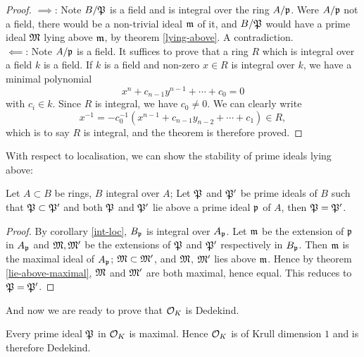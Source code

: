 			\begin{proof}
				$\implies$: Note $B/\mathfrak{P}$ is a field and is integral over the ring $A/\mathfrak{p}$. Were $A/\mathfrak{p}$ not a field, there would be a non-trivial ideal $\mathfrak{m}$ of it, and $B/\mathfrak{P}$ would have a prime ideal $\mathfrak{M}$ lying above $\mathfrak{m}$, by theorem \ref{lying-above}. A contradiction. \\
				$\impliedby$: Note $A/\mathfrak{p}$ is a field. It suffices to prove that a ring $R$ which is integral over a field $k$ is a field. If $k$ is a field and non-zero $x \in R$ is integral over $k$, we have a minimal polynomial
				\[
				x^n+c_{n-1}y^{n-1}+\cdots+c_0=0
				\]
				with $c_i \in k$. Since $R$ is integral, we have $c_0 \ne 0$. We can clearly write
				\[
				x^{-1}=-c_0^{-1}(x^{n-1}+c_{n-1}y_{n-2}+\cdots+c_1) \in R,
				\]
				which is to say $R$ is integral, and the theorem is therefore proved.
			\end{proof}
			With respect to localisation, we can show the stability of prime ideals lying above:
			\begin{corollary}
				Let $A \subset B$ be rings, $B$ integral over $A$; Let $\mathfrak{P}$ and $\mathfrak{P}'$ be prime ideals of $B$ such that $\mathfrak{P} \subset \mathfrak{P}'$ and both $\mathfrak{P}$ and $\mathfrak{P}'$ lie above a prime ideal $\mathfrak{p}$ of $A$, then $\mathfrak{P}=\mathfrak{P}'$. 
			\end{corollary}
			\begin{proof}
				By corollary \ref{int-loc}, $B_\mathfrak{p}$ is integral over $A_\mathfrak{p}$. Let $\mathfrak{m}$ be the extension of $\mathfrak{p}$ in $A_\mathfrak{p}$ and $\mathfrak{M},\mathfrak{M}'$ be the extensions of $\mathfrak{P}$ and $\mathfrak{P}'$ respectively in $B_\mathfrak{p}$. Then $\mathfrak{m}$ is the maximal ideal of $A_\mathfrak{p}$; $\mathfrak{M} \subset \mathfrak{M}'$, and $\mathfrak{M}$, $\mathfrak{M}'$ lies above $\mathfrak{m}$. Hence by theorem \ref{lie-above-maximal}, $\mathfrak{M}$ and $\mathfrak{M}'$ are both maximal, hence equal. This reduces to $\mathfrak{P}=\mathfrak{P}'$.
			\end{proof}
			And now we are ready to prove that $\mathcal{O}_K$ is Dedekind.
			
			\begin{theorem}\label{o_k-dedekind}
				Every prime ideal $\mathfrak{P}$ in $\mathcal{O}_K$ is maximal. Hence $\mathcal{O}_K$ is of Krull dimension $1$ and is therefore Dedekind.
			\end{theorem}
			
